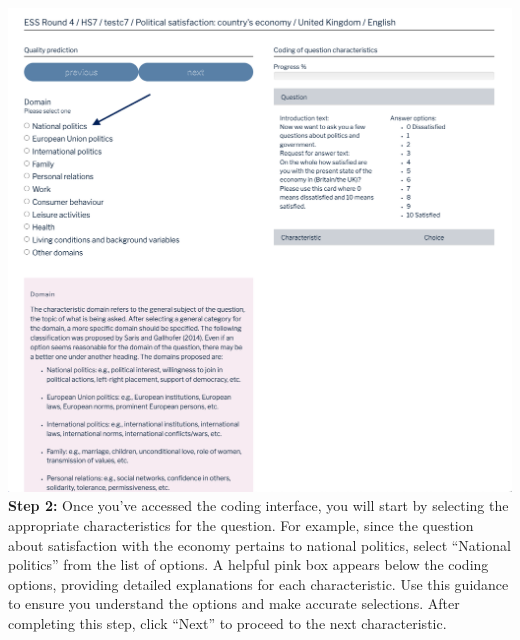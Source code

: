 \documentclass[
  letterpaper,
  DIV=11,
  numbers=noendperiod]{scrartcl}
\begin{document}
\begin{tcolorbox}
\includegraphics{img/coding.png} \textbf{Step 2:} Once you've accessed
the coding interface, you will start by selecting the appropriate
characteristics for the question. For example, since the question about
satisfaction with the economy pertains to national politics, select
``National politics'' from the list of options. A helpful pink box
appears below the coding options, providing detailed explanations for
each characteristic. Use this guidance to ensure you understand the
options and make accurate selections. After completing this step, click
``Next'' to proceed to the next characteristic.


\end{tcolorbox}
\end{document}
